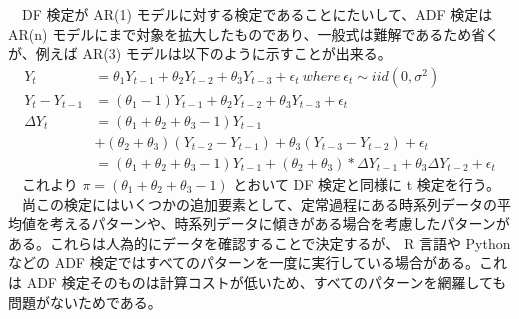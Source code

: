 \documentclass[dvipdfmx]{scrartcl}
\begin{document}
　DF 検定が AR(1) モデルに対する検定であることにたいして、ADF 検定は AR(n) モデルにまで対象を拡大したものであり、一般式は難解であるため省くが、例えば AR(3) モデルは以下のように示すことが出来る。\\
   \begin{align}
   Y_t &= \theta_1 Y_{t-1} + \theta_2 Y_{t-2} + \theta_3  Y_{t-3} + \epsilon_t \ where \ \epsilon_t \sim iid(0,\sigma^2) \\
   Y_t - Y_{t-1} &= (\theta_1 - 1) Y_{t-1} + \theta_2  Y_{t-2} + \theta_3  Y_{t-3} + \epsilon_t \\
   \Delta Y_t &= (\theta_1 + \theta_2 + \theta_3 - 1)  Y_{t-1} \nonumber \\
&+ (\theta_2 + \theta_3) (Y_{t-2} - Y_{t-1}) + \theta_3 (Y_{t-3} - Y_{t-2}) + \epsilon_t \nonumber \\
&= (\theta_1 + \theta_2 + \theta_3 - 1) Y_{t-1} + (\theta_2 + \theta_3) * \Delta Y_{t-1} + \theta_3 \Delta Y_{t-2} + \epsilon_t
   \end{align}
　これより \(\pi = (\theta_1 + \theta_2 + \theta_3 - 1)\) とおいて DF 検定と同様に t 検定を行う。\\
　尚この検定にはいくつかの追加要素として、定常過程にある時系列データの平均値を考えるパターンや、時系列データに傾きがある場合を考慮したパターンがある。これらは人為的にデータを確認することで決定するが、 R 言語や Python などの ADF 検定ではすべてのパターンを一度に実行している場合がある。これは ADF 検定そのものは計算コストが低いため、すべてのパターンを網羅しても問題がないためである。\\
\end{document}

